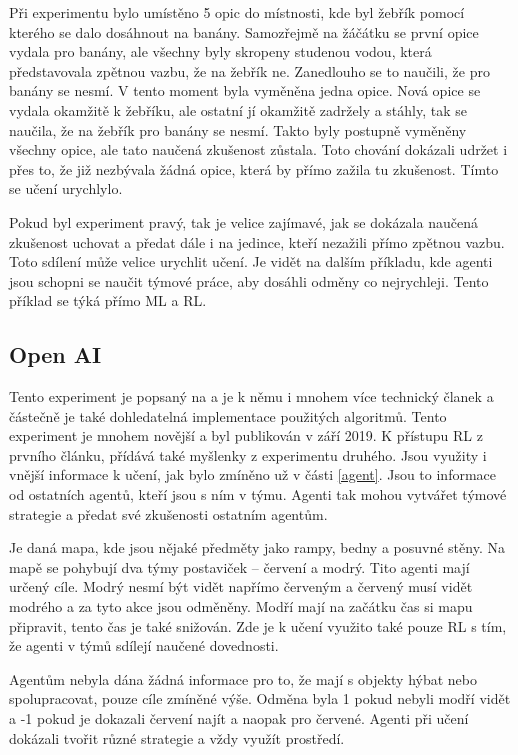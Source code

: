 \documentclass{article}
\begin{document}
Při experimentu bylo umístěno 5 opic do místnosti, kde byl žebřík pomocí kterého se dalo dosáhnout na banány. Samozřejmě na žáčátku se první opice vydala pro banány, ale všechny byly skropeny studenou vodou, která představovala zpětnou vazbu, že na žebřík ne. Zanedlouho se to naučili, že pro banány se nesmí. V tento moment byla vyměněna jedna opice. Nová opice se vydala okamžitě k žebříku, ale ostatní jí okamžitě zadržely a stáhly, tak se naučila, že na žebřík pro banány se nesmí. Takto byly postupně vyměněny všechny opice, ale tato naučená zkušenost zůstala. Toto chování dokázali udržet i přes to, že již nezbývala žádná opice, která by přímo zažila tu zkušenost. Tímto se učení urychlylo.

Pokud byl experiment pravý, tak je velice zajímavé, jak se dokázala naučená zkušenost uchovat a předat dále i na jedince, kteří nezažili přímo zpětnou vazbu. Toto sdílení může velice urychlit učení. Je vidět na dalším příkladu, kde agenti jsou schopni se naučit týmové práce, aby dosáhli odměny co nejrychleji. Tento příklad se týká přímo ML a RL.


\subsection{Open AI}
\label{openai}
Tento experiment je popsaný na \cite{openAI} a je k němu i mnohem více technický članek \cite{baker2019emergent} a částečně je také dohledatelná implementace použitých algoritmů. Tento experiment je mnohem novější a byl publikován v září 2019. K přístupu RL z prvního článku, přídává také myšlenky z experimentu druhého. Jsou využity i vnější informace k učení, jak bylo zmíněno už v části \ref{agent}. Jsou to informace od ostatních agentů, kteří jsou s ním v týmu. Agenti tak mohou vytvářet týmové strategie a předat své zkušenosti ostatním agentům. 

Je daná mapa, kde jsou nějaké předměty jako rampy, bedny a posuvné stěny. Na mapě se pohybují dva týmy postaviček -- červení a modrý. Tito agenti mají určený cíle. Modrý nesmí být vidět napřímo červeným a červený musí vidět modrého a za tyto akce jsou odměněny. Modří mají na začátku čas si mapu připravit, tento čas je také snižován. Zde je k učení využito také pouze RL s tím, že agenti v týmů sdílejí naučené dovednosti. 

Agentům nebyla dána žádná informace pro to, že mají s objekty hýbat nebo spolupracovat, pouze cíle zmíněné výše. Odměna byla 1 pokud nebyli modří vidět a -1 pokud je dokazali červení najít a naopak pro červené. Agenti při učení dokázali tvořit různé strategie a vždy využít prostředí. 
\end{document}
